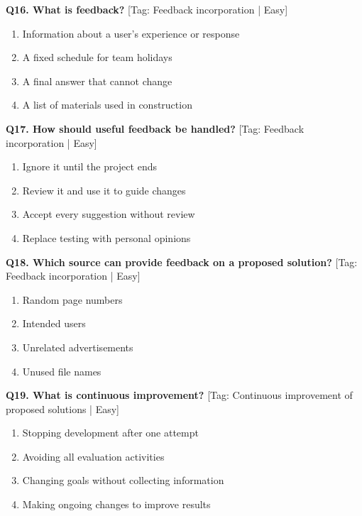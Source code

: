 \noindent\textbf{Q16. What is feedback?} \hfill [Tag: Feedback incorporation | Easy]
\begin{enumerate}[label=(\alph*),topsep=2pt,itemsep=1pt,partopsep=0pt,parsep=0pt]
    \item {Information about a user's experience or response}
    \item {A fixed schedule for team holidays}
    \item {A final answer that cannot change}
    \item {A list of materials used in construction}
\end{enumerate}
\vspace{2mm}

\noindent\textbf{Q17. How should useful feedback be handled?} \hfill [Tag: Feedback incorporation | Easy]
\begin{enumerate}[label=(\alph*),topsep=2pt,itemsep=1pt,partopsep=0pt,parsep=0pt]
    \item {Ignore it until the project ends}
    \item {Review it and use it to guide changes}
    \item {Accept every suggestion without review}
    \item {Replace testing with personal opinions}
\end{enumerate}
\vspace{2mm}

\noindent\textbf{Q18. Which source can provide feedback on a proposed solution?} \hfill [Tag: Feedback incorporation | Easy]
\begin{enumerate}[label=(\alph*),topsep=2pt,itemsep=1pt,partopsep=0pt,parsep=0pt]
    \item {Random page numbers}
    \item {Intended users}
    \item {Unrelated advertisements}
    \item {Unused file names}
\end{enumerate}
\vspace{2mm}

\noindent\textbf{Q19. What is continuous improvement?} \hfill [Tag: Continuous improvement of proposed solutions | Easy]
\begin{enumerate}[label=(\alph*),topsep=2pt,itemsep=1pt,partopsep=0pt,parsep=0pt]
    \item {Stopping development after one attempt}
    \item {Avoiding all evaluation activities}
    \item {Changing goals without collecting information}
    \item {Making ongoing changes to improve results}
\end{enumerate}
\vspace{2mm}

